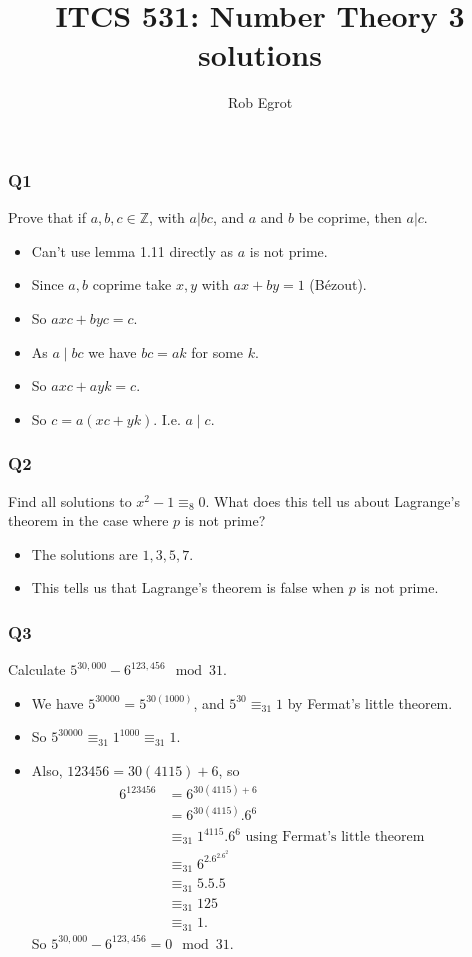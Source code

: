 \documentclass[handout]{beamer}
\title{ITCS 531: Number Theory 3 solutions}
\date{}
\author{Rob Egrot}
\newcommand{\bZ}{\mathbb{Z}}
\begin{document}
\begin{frame}
\titlepage
\end{frame}

\begin{frame}
\frametitle{Q1}
Prove that if $a,b,c\in\bZ$, with $a|bc$, and $a$ and $b$ be coprime, then $a|c$.
\begin{itemize}
\item Can't use lemma 1.11 directly as $a$ is not prime.
\item Since $a,b$ coprime take $x,y$ with $ax+by = 1$ (B\'ezout).
\item So $axc+byc = c$.
\item As $a\mid bc$ we have $bc= ak$ for some $k$.
\item So $axc +ayk = c$.
\item So $c = a(xc+yk)$. I.e. $a\mid c$.
\end{itemize}
\end{frame}

\begin{frame}
\frametitle{Q2}
Find all solutions to $x^2- 1 \equiv_{8} 0$. What does this tell us about Lagrange's theorem in the case where $p$ is not prime?
\vspace{1cm}
\begin{itemize}
\item The solutions are $1,3,5,7$. 
\vspace{0.5cm}
\item This tells us that Lagrange's theorem is false when $p$ is not prime.
\end{itemize}
\end{frame}

\begin{frame}
\frametitle{Q3}
Calculate $5^{30,000} - 6^{123,456}\mod 31$. 
\vspace{0.3cm}
\begin{itemize}
\item We have $5^{30000} = 5^{30(1000)}$, and $5^{30} \equiv_{31} 1$ by Fermat's little theorem. 
\item So $5^{30000}\equiv_{31} 1^{1000} \equiv_{31} 1$. 
\item Also, $123456= 30(4115)+6$, so 
\begin{align*}
6^{123456} &= 6^{30(4115)+6}\\
&= 6^{30(4115)}.6^6 \\
&\equiv_{31} 1^{4115}.6^6 \text{ using Fermat's little theorem}\\
&\equiv_{31} 6^2.6^2.6^2\\
&\equiv_{31} 5.5.5\\
&\equiv_{31} 125 \\
&\equiv_{31} 1.
\end{align*} 
So $5^{30,000} - 6^{123,456} = 0\mod 31$.
\end{itemize}
\end{frame}
\end{document}

